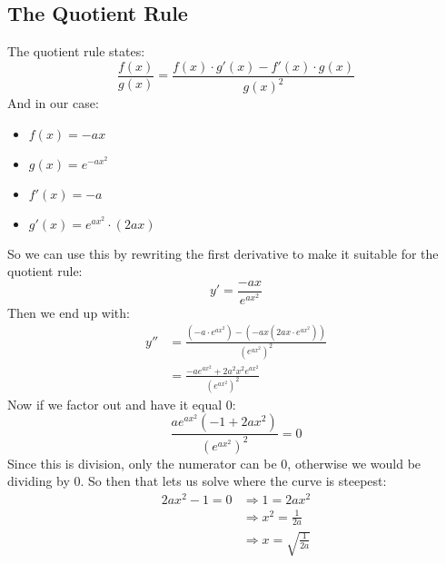 \documentclass[a4paper,12pt]{article}
\begin{document}
\subsection*{The Quotient Rule}
The quotient rule states:
\begin{displaymath}
    \frac{f\left(x\right)}{g\left(x\right)} = %
    \frac{f\left(x\right) \cdot g'\left(x\right) - f'\left(x\right) 
    \cdot g\left(x\right)}{g\left(x\right)^2}
\end{displaymath}
And in our case:
\begin{itemize}
    \item $f\left(x\right) = -ax$ %
    \item $g\left(x\right) = e^{-ax^2}$
    \item $f'\left(x\right) = -a$
    \item $g'\left(x\right) = e^{ax^2} \cdot \left(2ax\right)$
\end{itemize}
So we can use this by rewriting the first derivative to make it suitable for 
the quotient rule:
\begin{displaymath}
    y' = \frac{-ax}{e^{ax^2}}
\end{displaymath}
Then we end up with:
\begin{equation}
    \begin{split} %
        y'' &= \frac{\left(-a \cdot e^{ax^2}\right) - 
        \left(-ax\left(2ax \cdot e^{ax^2}\right)\right)}
        {\left(e^{ax^2}\right)^2} \\ %
            &= \frac{-ae^{ax^2} + 2a^2x^2e^{ax^2}} %
            {\left(e^{ax^2}\right)^2}
    \end{split}
\end{equation}
Now if we factor out and have it equal $0$:
\begin{equation}
    \frac{ae^{ax^2}\left(-1+2ax^2\right)}
    {\left(e^{ax^2}\right)^2} = 0 %
\end{equation}
Since this is division, only the numerator can be $0$, 
otherwise we would be dividing by $0$. 
So then that lets us solve where the curve is steepest:
\begin{displaymath}
    \begin{split} %
        2ax^2-1 = 0 &\Rightarrow 1 = 2ax^2 \\ %
                    &\Rightarrow x^2 = \frac{1}{2a} \\ %
                    &\Rightarrow x = \sqrt{\frac{1}{2a}}
    \end{split}
\end{displaymath}
\end{document}
